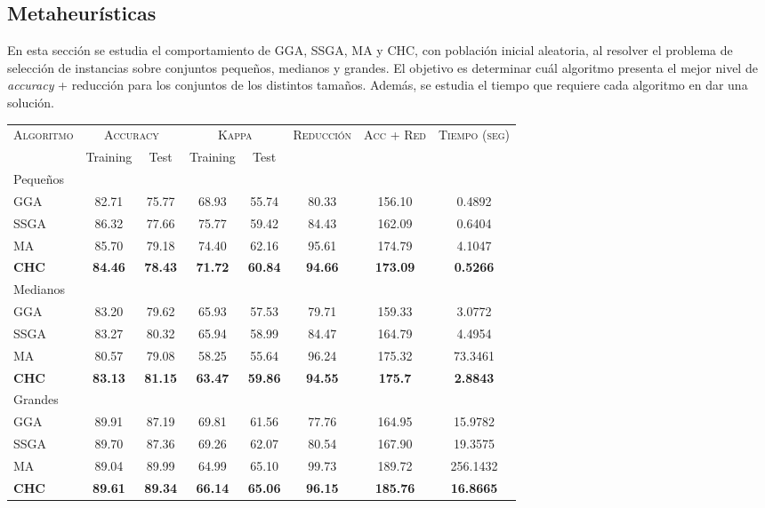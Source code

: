 \subsection{Metaheurísticas}

En esta sección se estudia el comportamiento de GGA, SSGA, MA y CHC, con población inicial aleatoria, al resolver el problema de selección de instancias sobre conjuntos pequeños, medianos y grandes. El objetivo es determinar cuál algoritmo presenta el mejor nivel de \emph{accuracy} + reducción para los conjuntos de los distintos tamaños. Además, se estudia el tiempo que requiere cada algoritmo en dar una solución.


\begin{table}[h!]
\centering
\begin{adjustbox}{max width =\textwidth}
\begin{tabular}{l c c c c c c c}
\hline
\multirow{2}{*}{\textsc{Algoritmo}}
	& \multicolumn{2}{c}{\textsc{Accuracy}}
	& \multicolumn{2}{c}{\textsc{Kappa}}
	& \textsc{Reducción}
	& \textsc{Acc + Red}
	& \textsc{Tiempo (seg)} \\
	& Training & Test
	& Training & Test \\ 
\hline
\hline

Pequeños\\
GGA  & 82.71 & 75.77 & 68.93 & 55.74 & 80.33 & 156.10 & 0.4892 \\
SSGA & 86.32 & 77.66 & 75.77 & 59.42 & 84.43 & 162.09 & 0.6404 \\
MA   & 85.70 & 79.18 & 74.40 & 62.16 & 95.61 & 174.79 & 4.1047 \\
\textbf{CHC}  & \textbf{84.46} & \textbf{78.43} & \textbf{71.72} & \textbf{60.84} & \textbf{94.66} & \textbf{173.09} & \textbf{0.5266} \\

\hline

Medianos\\
GGA  & 83.20 & 79.62 & 65.93 & 57.53 & 79.71 & 159.33 & 3.0772 \\
SSGA & 83.27 & 80.32 & 65.94 & 58.99 & 84.47 & 164.79 & 4.4954 \\
MA   & 80.57 & 79.08 & 58.25 & 55.64 & 96.24 & 175.32 & 73.3461 \\
\textbf{CHC}  & \textbf{83.13} & \textbf{81.15} & \textbf{63.47} & \textbf{59.86} & \textbf{94.55} & \textbf{175.7}  & \textbf{2.8843} \\

\hline
Grandes\\
GGA  & 89.91 & 87.19 & 69.81 & 61.56 & 77.76 & 164.95 & 15.9782 \\
SSGA & 89.70 & 87.36 & 69.26 & 62.07 & 80.54 & 167.90 & 19.3575 \\
MA   & 89.04 & 89.99 & 64.99 & 65.10 & 99.73 & 189.72 & 256.1432 \\
\textbf{CHC}  & \textbf{89.61} & \textbf{89.34} & \textbf{66.14} & \textbf{65.06} & \textbf{96.15} & \textbf{185.76} & \textbf{16.8665} \\


\end{tabular}
\end{adjustbox}
\end{table}
